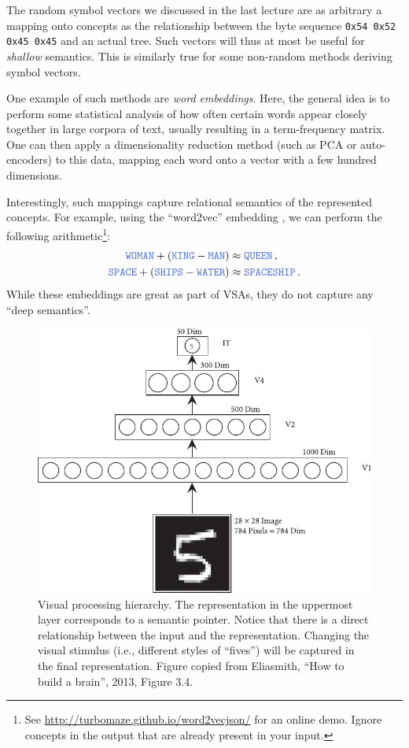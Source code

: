 \documentclass[10pt,letterpaper,oneside]{article}
\newcommand{\Obj}[1]{\ensuremath{\mathtt{\textcolor{RoyalBlue}{#1}}}}
\begin{document}
The random symbol vectors we discussed in the last lecture are as arbitrary a mapping onto concepts as the relationship between the byte sequence \texttt{0x54 0x52 0x45 0x45} and an actual tree. Such vectors will thus at most be useful for \emph{shallow} semantics. This is similarly true for some non-random methods deriving symbol vectors.

One example of such methods are \emph{word embeddings}. Here, the general idea is to perform some statistical analysis of how often certain words appear closely together in large corpora of text, usually resulting in a term-frequency matrix. One can then apply a dimensionality reduction method (such as PCA or auto-encoders) to this data, mapping each word onto a vector with a few hundred dimensions.

Interestingly, such mappings capture relational semantics of the represented concepts. For example, using the \enquote{word2vec} embedding \cite{mikolov2013efficient}, we can perform the following arithmetic\footnote{See \url{http://turbomaze.github.io/word2vecjson/} for an online demo. Ignore concepts in the output that are already present in your input.}:
\begin{align*}
	\Obj{WOMAN} + (\Obj{KING} - \Obj{MAN}) &\approx \Obj{QUEEN} \,,\\
	\Obj{SPACE} + (\Obj{SHIPS} - \Obj{WATER}) &\approx \Obj{SPACESHIP} \,.
\end{align*}
While these embeddings are great as part of VSAs, they do not capture any \enquote{deep semantics}.

\begin{figure}[p]
	\centering
	\includegraphics[scale=1.15]{media/htbab_hierarchy.pdf}
	\caption{Visual processing hierarchy. The representation in the uppermost layer corresponds to a semantic pointer. Notice that there is a direct relationship between the input and the representation. Changing the visual stimulus (i.e., different styles of \enquote{fives}) will be captured in the final representation. Figure copied from Eliasmith, \enquote{How to build a brain}, 2013, Figure 3.4.}
	\label{fig:htbab_hierarchy}
\end{figure}
\end{document}
